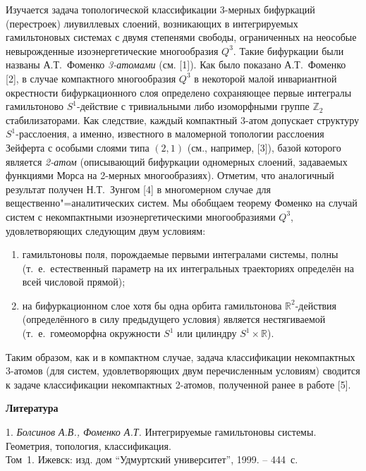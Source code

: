 \vzmscaption

Изучается задача топологической классификации 3-мер\-ных бифуркаций (перестроек) лиувиллевых слоений, возникающих в интегрируемых гамильтоновых системах с двумя степенями свободы, ограниченных на неособые невырожденные изоэнергетические многообразия $Q^3$. Такие бифуркации были названы А.Т.~Фоменко {\it 3-атомами} (см. [1]). Как было показано А.Т.~Фоменко [2], в случае компактного многообразия $Q^3$ в некоторой малой инвариантной окрестности бифуркационного слоя определено сохраняющее первые интегралы гамильтоново $S^1$-действие с тривиальными либо изоморфными группе $\mathbb Z_2$ стабилизаторами. Как следствие, каждый компактный 3-атом допускает структуру $S^1$-расслоения, а именно, известного в маломерной топологии расслоения Зейферта с особыми слоями типа $(2,1)$ (см., например, [3]), базой которого является {\it 2-атом} (описывающий бифуркации одномерных слоений, задаваемых функциями Морса на 2-мерных многообразиях). Отметим, что аналогичный результат получен Н.Т.~Зунгом [4] в многомерном случае для вещественно"=аналитических систем. Мы обобщаем теорему Фоменко на случай систем с некомпактными изоэнергетическими многообразиями $Q^3$, удовлетворяющих следующим двум условиям:
\begin{enumerate}
	\item гамильтоновы поля, порождаемые первыми интегралами системы, полны (т.~е.~естественный параметр на их интегральных траекториях определён на всей числовой прямой);
	\item на бифуркационном слое хотя бы одна орбита гамильтонова $\mathbb R^2$-действия (определённого в силу предыдущего условия) является нестягиваемой (т.~е.~гомеоморфна окружности $S^1$ или цилиндру $S^1\times\mathbb R$).
\end{enumerate}
Таким образом, как и в компактном случае, задача классификации некомпактных 3-атомов (для систем, удовлетворяющих двум перечисленным условиям) сводится к задаче классификации некомпактных 2-атомов, полученной ранее в работе [5].



\smallskip \centerline {\bf Литература} \nopagebreak

1. {\it Болсинов А.В., Фоменко А.Т.} Интегрируемые гамильтоновы системы. Геометрия, топология, классификация. \\ Том~1. Ижевск: изд. дом ``Удмуртский университет'', 1999. -- 444~с.

